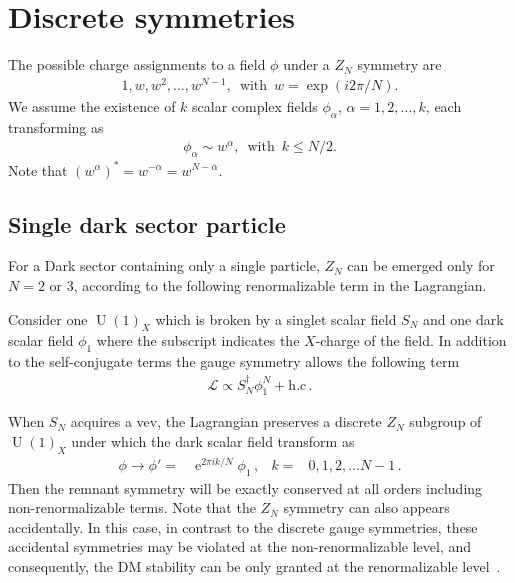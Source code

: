 \documentclass[prd,amsfonts,aps,nofootinbib,notitlepage,11pt,superscriptaddress]{revtex4-1}
\begin{document}
\section{Discrete symmetries}

The possible charge assignments to a field $\phi$ under a $Z_N$ symmetry are
\begin{align}
    1,w, w^2, ...,w^{N-1}, \,\,\,\text{with}\,\,\,w=\exp(i2\pi/N). 
\end{align}
We assume the existence of $k$ scalar complex fields $\phi_\alpha$, $\alpha=1,2,...,k$, each transforming as
\begin{align}
    \phi_\alpha\sim w^\alpha,  \,\,\,\text{with}\,\,\,k\leq N/2.
\end{align}
Note that $(w^\alpha)^*=w^{-\alpha}=w^{N-\alpha}$. 

\subsection{Single dark sector particle}
For a Dark sector containing only a single particle, $Z_N$ can be emerged only for $N=2$ or $3$, according to the following renormalizable term in the Lagrangian.

Consider one $\operatorname{U}(1)_X$ which is broken by a singlet scalar field $S_N$ and one dark scalar field $\phi_1$ where the subscript indicates the $X$-charge of the field. In addition to the self-conjugate terms the gauge symmetry allows the following term~\cite{Batell:2010bp}
\begin{align}
  \label{eq:zncon}
  \mathcal{L}\varpropto S_N^{\dagger}\phi_1^N + \text{h.c}\,.
\end{align}

When $S_N$ acquires a vev, the Lagrangian preserves a discrete $Z_N$ subgroup of $\operatorname{U}(1)_X$ under which the dark scalar field transform as
\begin{align}
  \phi\to \phi' = &\operatorname{e}^{2\pi i k/N} \phi_1\,,& k=&0,1,2,\ldots N-1\,.
\end{align}
Then the remnant symmetry will be exactly conserved at all orders
including non-renormalizable terms.  Note that the $Z_N$ symmetry can
also appears accidentally. In this case, in contrast to the discrete
gauge symmetries, these accidental symmetries may be violated at the
non-renormalizable level, and consequently, the DM stability can be
only granted at the renormalizable level~\cite{Batell:2010bp}.
\end{document}
